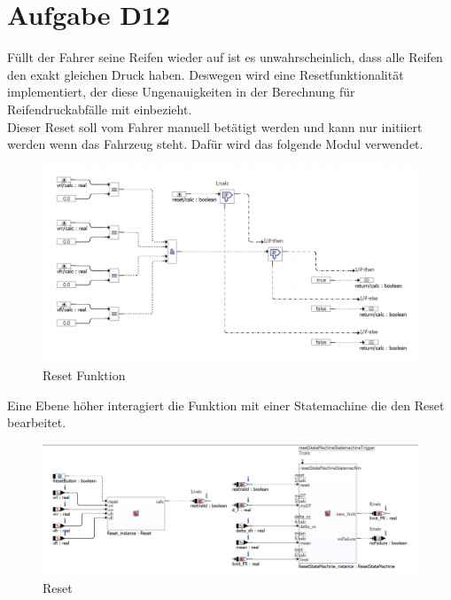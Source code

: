 
\chapter{Aufgabe D12}
Füllt der Fahrer seine Reifen wieder auf ist es unwahrscheinlich, dass alle Reifen den exakt gleichen Druck haben. Deswegen wird eine Resetfunktionalität implementiert, der diese Ungenauigkeiten in der Berechnung für Reifendruckabfälle mit einbezieht.\\ 
Dieser Reset soll vom Fahrer manuell betätigt werden und kann nur initiiert werden wenn das Fahrzeug steht. Dafür wird das folgende Modul verwendet.
\begin{figure}[H]
	\centering
	\includegraphics[width=0.9\linewidth]{../Graphiken/Reset.png}
	\caption{Reset Funktion}
	\label{fig:Reset}
\end{figure}
Eine Ebene höher interagiert die Funktion mit einer Statemachine die den Reset bearbeitet.
 \begin{figure}[H]
 	\centering
 	\includegraphics[width=\linewidth]{../Graphiken/ResetTop1.png}
 	\caption{Reset}
 	\label{fig:ResetTop}
 \end{figure}


